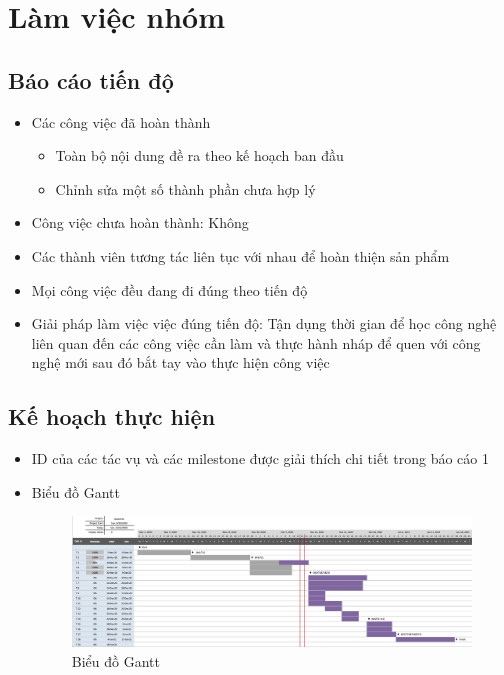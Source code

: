 \documentclass[a4paper, 12pt]{article}
\begin{document}
\clearpage

\section{Làm việc nhóm}

\subsection{Báo cáo tiến độ}

\begin{itemize}
	\item Các công việc đã hoàn thành
	\begin{itemize}
		\item Toàn bộ nội dung đề ra theo kế hoạch ban đầu
		\item Chỉnh sửa một số thành phần chưa hợp lý
	\end{itemize}
	\item Công việc chưa hoàn thành: Không
	\item Các thành viên tương tác liên tục với nhau để hoàn thiện sản phẩm
	\item Mọi công việc đều đang đi đúng theo tiến độ
	\item Giải pháp làm việc việc đúng tiến độ: Tận dụng thời gian để học công nghệ liên quan đến các công việc cần làm và thực hành nháp để quen với công nghệ mới sau đó bắt tay vào thực hiện công việc
\end{itemize}

\clearpage 

\subsection{Kế hoạch thực hiện}

\begin{itemize}
	\item ID của các tác vụ và các milestone được giải thích chi tiết trong báo cáo 1
	\item Biểu đồ Gantt 
	\begin{figure}[H]
		\begin{center}
			\includegraphics[scale=0.45, angle=90]{./image/gantt.png}
			\caption{Biểu đồ Gantt}
		\end{center}
	\end{figure}
\end{itemize}
\end{document}
